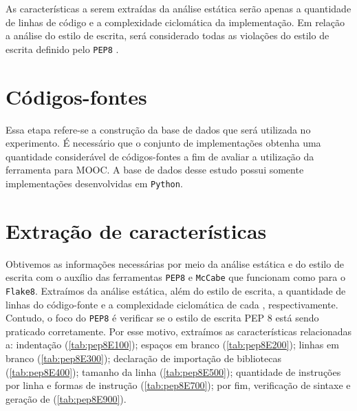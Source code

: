 		As características a serem extraídas da análise estática serão apenas a quantidade
		de linhas de código e a complexidade ciclomática da implementação. Em relação
		a análise do estilo de escrita, será considerado todas as violações do estilo de
		escrita definido pelo \texttt{PEP8} \cite{van2001pep}. 

	\section{Códigos-fontes}	
		Essa etapa refere-se a construção da base de dados que será utilizada no experimento.
		É necessário que o conjunto de implementações obtenha uma quantidade considerável de
		códigos-fontes a fim de avaliar a utilização da ferramenta para \acs{MOOC}. A
		base de dados desse estudo possui somente implementações desenvolvidas em \texttt{Python}.
		
	\section{Extração de características}
		Obtivemos as informações necessárias por meio da análise estática e do estilo de   %
		escrita com o auxílio das ferramentas \texttt{PEP8} \cite{pep8} e \texttt{McCabe}
		\cite{mccabe} que funcionam como  para o \texttt{Flake8}.
		Extraímos da análise estática, além do estilo de escrita, a quantidade de linhas do código-fonte e a %
		complexidade ciclomática de cada , respectivamente. Contudo, o
		foco do \texttt{PEP8} é verificar se o estilo de escrita PEP 8 \cite{van2001pep}
		está sendo praticado corretamente. Por esse motivo, extraímos as características
		relacionadas a: indentação (\cref{tab:pep8E100}); espaços em branco
		(\cref{tab:pep8E200}); linhas em branco (\cref{tab:pep8E300}); declaração de
		importação de bibliotecas (\cref{tab:pep8E400}); tamanho da linha (\cref{tab:pep8E500});
		quantidade de instruções por linha e formas de instrução (\cref{tab:pep8E700}); por fim,
		verificação de sintaxe e geração de  (\cref{tab:pep8E900}).
	

